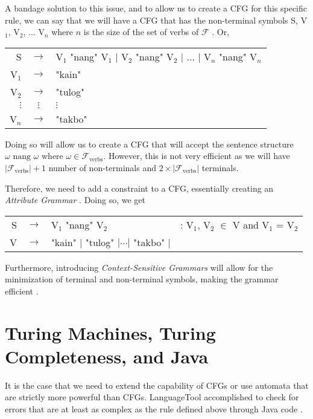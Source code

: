 A bandage solution to this issue, and to allow us to create a CFG for this specific rule, we can say that we will have a CFG that has the non-terminal symbols S, V$_1$, V$_2$, $\dots$ V$_n$ where $n$ is the size of the set of verbs of $\mathcal{F}$ \cite{Seki_Matsumura_Fujii_Kasami_1991}. Or,

\begin{center}
    \begin{tabular}{rcl}
         S & $\to$ & V$_1$ "nang" V$_1$ $|$ V$_2$ "nang" V$_2$ $|$ $\dots$ $|$ V$_n$ "nang" V$_n$  \\
         V$_1$ & $\to$ & "kain" \\
         V$_2$ & $\to$ & "tulog" \\
         $\vdots$ & $\vdots$ & $\vdots$ \\
         V$_n$ & $\to$ & "takbo"
    \end{tabular}
\end{center}

Doing so will allow us to create a CFG that will accept the sentence structure $\omega \text{ nang } \omega$ where $\omega \in \mathcal{F}_\text{verbs}$. However, this is not very efficient as we will have $|\mathcal{F}_\text{verbs}| + 1$ number of non-terminals and $2\times|\mathcal{F}_\text{verbs}|$ terminals.

Therefore, we need to add a constraint to a CFG, essentially creating an \textit{Attribute Grammar} \cite{kalita_kumar_roy_2022}. Doing so, we get

\begin{center}
    \begin{tabular}{rcll}
         S &$\to$& V$_1$ "nang" V$_2$ & : V$_1$, V$_2$ $\in$ V and V$_1$ = V$_2$  \\
         V &$\to$& "kain" $|$ "tulog" $| \cdots |$ "takbo" $|$ &
    \end{tabular}
\end{center}

Furthermore, introducing \textit{Context-Sensitive Grammars} will allow for the minimization of terminal and non-terminal symbols, making the grammar efficient \cite{Stabler_2004, Rawski_Dolatian_Heinz_Raimy_2023}. 

\section{Turing Machines, Turing Completeness, and Java}

It is the case that we need to extend the capability of CFGs or use automata that are strictly more powerful than CFGs. LanguageTool accomplished to check for errors that are at least as complex as the rule defined above through Java code \cite{LanguageToolDevDocs}.

